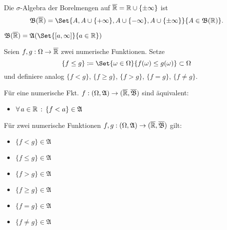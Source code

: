 \documentclass{cheat-sheet}
\newcommand{\ER}{\overline\R} %
\newcommand{\Alg}{\mathfrak{A}} %
\newcommand{\Bor}{\mathfrak{B}} %
\begin{document}
\begin{defn}
  Die $\sigma$-Algebra der Borelmengen auf $\ER = \R \cup \{ \pm \infty \}$ ist
  \[ \Bor(\ER) = \Set{ A, A \cup \{ +\infty \}, A \cup \{ -\infty \}, A \cup \{ \pm \infty \} }{ A \in \Bor(\R) }. \]
\end{defn}

\begin{satz}
  $\Bor(\ER) = \Alg(\Set{ [a, \infty] }{ a \in \R })$
\end{satz}

\begin{nota}
  Seien $f, g : \Omega \to \overline{\mathbb{R}}$ zwei numerische Funktionen. Setze
    \[ \{ f \leq g \} \coloneqq \Set{ \omega \in \Omega }{ f(\omega) \leq g(\omega) } \subset \Omega \]
  und definiere analog $\{ f < g \}$, $\{ f \geq g \}$, $\{ f > g \}$, $\{ f = g \}$, $\{ f \not= g \}$.
\end{nota}

\begin{satz}
  Für eine numerische Fkt. $f : (\Omega, \Alg) \to (\ER, \overline{\Bor})$ sind äquivalent:
  \begin{itemize}
    \miniitem{0.7 \linewidth}{$\forall \, a \in \R \,:\, \{ f \geq a \} = f^{-1}([a, \infty]) \in \Alg$}
    \item $\forall \, a \in \R \,:\, \{ f < a \} \in \Alg$
  \end{itemize}
\end{satz}

\begin{satz}
  Für zwei numerische Funktionen $f, g : (\Omega, \Alg) \to (\ER, \overline{\Bor})$ gilt:
  \begin{multicols}{3}
    \begin{itemize}
      \item $\{ f < g \} \in \Alg$
      \item $\{ f \leq g \} \in \Alg$
      \item $\{ f > g \} \in \Alg$
      \item $\{ f \geq g \} \in \Alg$
      \item $\{ f = g \} \in \Alg$
      \item $\{ f \not= g \} \in \Alg$
    \end{itemize}
  \end{multicols}
\end{satz}
\end{document}
